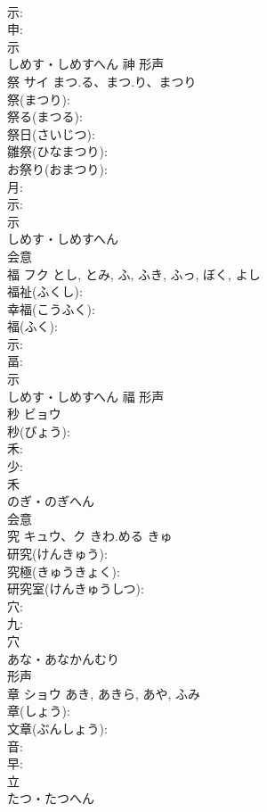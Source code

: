\documentclass[8pt]{extreport}
\begin{document}
\begin{CJK}{UTF8}{min}
\\	示: 
\\	申: 
\\	示	
\\	しめす・しめすへん	神	形声 
\\	祭	サイ	まつ.る、まつ.り、まつり		
\\	祭(まつり): 
\\	祭る(まつる): 
\\	祭日(さいじつ): 
\\	雛祭(ひなまつり): 
\\	お祭り(おまつり): 
\\	月: 
\\	示: 
\\	示	
\\	しめす・しめすへん	
\\	会意 
\\	福	フク		とし, とみ, ふ, ふき, ふっ, ぼく, よし	
\\	福祉(ふくし): 
\\	幸福(こうふく): 
\\	福(ふく): 
\\	示: 
\\	畐: 
\\	示	
\\	しめす・しめすへん	福	形声 
\\	秒	ビョウ			
\\	秒(びょう): 
\\	禾: 
\\	少: 
\\	禾	
\\	のぎ・のぎへん	
\\	会意 
\\	究	キュウ、ク	きわ.める	きゅ	
\\	研究(けんきゅう): 
\\	究極(きゅうきょく): 
\\	研究室(けんきゅうしつ): 
\\	穴: 
\\	九: 
\\	穴	
\\	あな・あなかんむり	
\\	形声 
\\	章	ショウ		あき, あきら, あや, ふみ	
\\	章(しょう): 
\\	文章(ぶんしょう): 
\\	音: 
\\	早: 
\\	立	
\\	たつ・たつへん	

\end{CJK}
\end{document}
